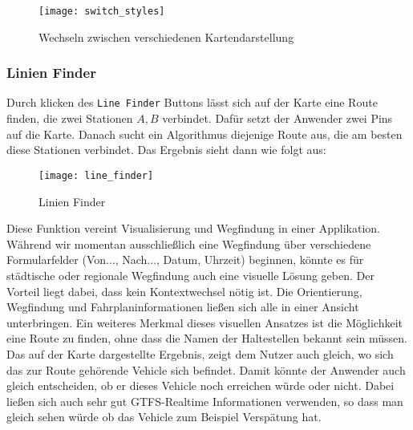     \begin{figure}[htbp]
      \begin{center}
        \texttt{[image: switch\_styles]}
        \caption{Wechseln zwischen verschiedenen Kartendarstellung}
        \label{fig:switch_styles}
      \end{center}
    \end{figure}
    

  \subsubsection*{Linien Finder}
  \label{ssub:linien_finder}
    Durch klicken des \texttt{Line Finder}  Buttons lässt sich auf der Karte eine Route finden, die zwei Stationen $A, B$ verbindet. Dafür setzt der Anwender zwei Pins auf die Karte. Danach sucht ein Algorithmus diejenige Route aus, die am besten diese Stationen verbindet. Das Ergebnis sieht dann wie folgt aus:

    \begin{figure}[htbp]
      \begin{center}
        \texttt{[image: line\_finder]}
        \caption{Linien Finder}
        \label{fig:line_finder}
      \end{center}
    \end{figure}

    Diese Funktion vereint Visualisierung und Wegfindung in einer Applikation. Während wir momentan ausschließlich eine Wegfindung über verschiedene Formularfelder (Von..., Nach..., Datum, Uhrzeit) beginnen, könnte es für städtische oder regionale Wegfindung auch eine visuelle Lösung geben. Der Vorteil liegt dabei, dass kein Kontextwechsel nötig ist. Die Orientierung, Wegfindung und Fahrplaninformationen ließen sich alle in einer Ansicht unterbringen. Ein weiteres Merkmal dieses visuellen Ansatzes ist die Möglichkeit eine Route zu finden, ohne dass die Namen der Haltestellen bekannt sein müssen. Das auf der Karte dargestellte Ergebnis, zeigt dem Nutzer auch gleich, wo sich das zur Route gehörende Vehicle sich befindet. Damit könnte der Anwender auch gleich entscheiden, ob er dieses Vehicle noch erreichen würde oder nicht. Dabei ließen sich auch sehr gut GTFS-Realtime Informationen verwenden, so dass man gleich sehen würde ob das Vehicle zum Beispiel Verspätung hat.\\

